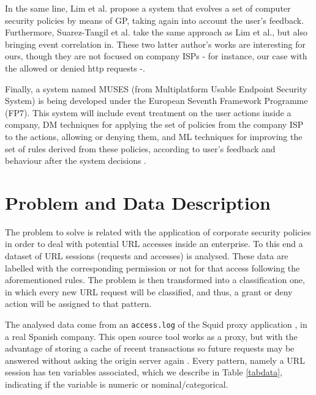 \documentclass{llncs}
\begin{document}
In the same line, Lim et al. propose a system \cite{sec_policy_evolution_gp_08,pol_evol_gp_3_approaches_08} that evolves a set of computer security policies by means of GP, taking again into account the user's feedback. Furthermore, Suarez-Tangil et al. \cite{rule_generation_gp_09} take the same approach as Lim et al., but also bringing event correlation in. These two latter author's works are interesting for ours, though they are not focused on company ISPs - for instance, our case with the allowed or denied http requests -.

Finally, a system named MUSES (from Multiplatform Usable Endpoint
Security System) \cite{MUSES_SAC_14} is being developed under the
European Seventh Framework Programme (FP7). This system will include
event treatment on the user actions inside a company, DM techniques
for applying the set of policies from the company ISP to the actions,
allowing or denying them, and ML techniques for improving the set of
rules derived from these policies, according to user's feedback and
behaviour after the system decisions \cite{muses_sotics_13}.   



%

\section{Problem and Data Description} 
\label{sec:problemDescription}

\noindent The problem to solve is related with the application of corporate security policies in order to deal with potential URL accesses inside an enterprise. To this end a dataset of URL sessions (requests and accesses) is analysed. These data are labelled with the corresponding permission or not for that access following the aforementioned rules. The problem is then transformed into a classification one, in which every new URL request will be classified, and thus, a grant or deny action will be assigned to that pattern.

The analysed data come from an \texttt{access.log} of the Squid
proxy application
\cite{squid:site}, in a real Spanish company. This open source tool
works as a proxy, but with the advantage of storing a cache of recent
transactions so future requests may be answered without asking the
origin server again \cite{DuaneWessels2004}.  
Every pattern, namely a URL session has ten variables associated,
which we describe in Table \ref{tabdata}, indicating if the variable
is numeric or nominal/categorical. 
\end{document}
